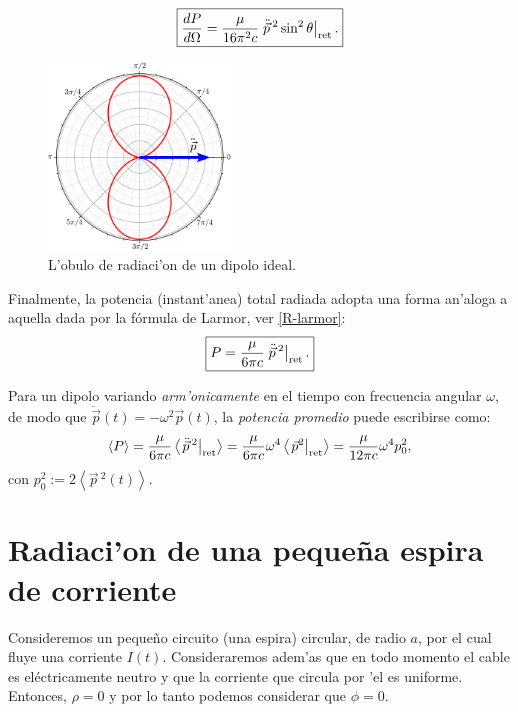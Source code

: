 \begin{equation}
\boxed{\frac{dP}{d\Omega}%
=\frac{\mu}{16\pi^2 c}\left.{\ddot{\vec{p}}{\,}^2}\sin^2\theta\right|_{\rm ret}.}
\end{equation}
\begin{figure}[H]
\centerline{\includegraphics[height=5cm]{fig/fig-dipolo.pdf}}
 \caption{L'obulo de radiaci'on de un dipolo ideal.}
\label{fig-dipolo}
\end{figure}
Finalmente, la potencia (instant'anea) total radiada adopta una forma an'aloga a aquella dada por la fórmula de Larmor, ver \eqref{R-larmor}:
\begin{equation}\label{PotdH}
\boxed{P=\frac{\mu}{6\pi c}\left.\ddot{\vec{p}}{\,}^2\right|_{\rm ret}.}
\end{equation}

Para un dipolo variando \textit{arm'onicamente} en el tiempo con frecuencia angular $\omega$, de modo que $\ddot{\vec{p}}(t)=-\omega^2\vec{p}(t)$, la \textit{potencia promedio} puede escribirse como:
\begin{equation}
\left\langle P\right\rangle
=\frac{\mu}{6\pi c}\left\langle\left.\ddot{\vec{p}}{\,}^2\right|_{\rm ret}\right\rangle 
=\frac{\mu}{6\pi c}\omega^4\left\langle\left.\vec{p}^2\right|_{\rm ret}\right\rangle
=\frac{\mu}{12\pi c}\omega^4 p_0^2,
\end{equation}
con $p_0^2:=2\left\langle \vec{p}{\,}^2(t)\right\rangle$.


\section{Radiaci'on de una pequeña espira de corriente}

Consideremos un pequeño circuito (una espira) circular, de radio $a$, por el cual fluye una corriente $I(t)$. Consideraremos adem'as que en todo momento  el cable es eléctricamente neutro y que la corriente que circula por 'el es uniforme. Entonces, $\rho=0$ y por lo tanto podemos considerar que $\phi=0$.

